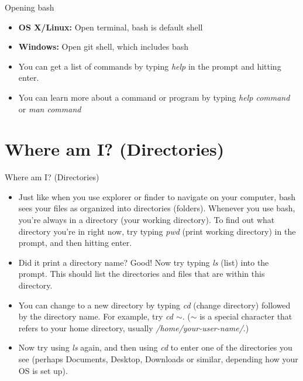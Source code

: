\documentclass{beamer}
\begin{document}
\begin{frame}[fragile]{Opening bash}
\begin{itemize}
    \item<1-> \textbf{OS X/Linux:} Open terminal, bash is default shell
    \item<1-> \textbf{Windows:} Open git shell, which includes bash
    \item<2-> You can get a list of commands by typing \emph{help} in the prompt and hitting enter.
    \item<3-> You can learn more about a command or program by typing \emph{help \textit{command}} or \emph{man \textit{command}}
\end{itemize}
\end{frame}

\section{Where am I? (Directories)}
\begin{frame}{Where am I? (Directories)}
\begin{itemize}
    \item<1-> Just like when you use explorer or finder to navigate on your computer, bash sees your files as organized into directories (folders). Whenever you use bash, you're always in a directory (your working directory). To find out what directory you're in right now, try typing \emph{pwd} (print working directory) in the prompt, and then hitting enter.
    \item<2-> Did it print a directory name? Good! Now try typing \emph{ls} (list) into the prompt. This should list the directories and files that are within this directory. 
    \item<3-> You can change to a new directory by typing \emph{cd} (change directory) followed by the directory name. For example, try \emph{cd $\sim$}. (\emph{$\sim$} is a special character that refers to your home directory, usually \textit{/home/your-user-name/}.) 
    \item<4-> Now try using \emph{ls} again, and then using \emph{cd} to enter one of the directories you see (perhaps Documents, Desktop, Downloads or similar, depending how your OS is set up).
\end{itemize}
\end{frame}
\end{document}
